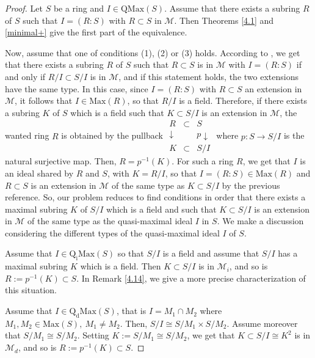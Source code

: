 \documentclass[12pt,leqno]{amsart}
\theoremstyle{definition}
\begin{document}
\begin{proof} Let $S$ be a ring and $I\in\mathrm{QMax}(S)$. Assume that there exists a subring $R$ of $S$ such that $I=(R:S)$ with $R\subset S$ in $\mathcal M$. Then Theorems \ref{4.1} and \ref{minimal+} give the first part of the equivalence. 

Now, assume that one of conditions (1), (2) or (3) holds. According to \cite[Proposition 4.7]{DPPS}, we get that there exists a subring $R$ of $S$ such that $R\subset S$ is in $\mathcal M$ with $I=(R:S)$ if and only if $R/I\subset S/I$ is in $\mathcal M$, and if this statement holds, the two extensions have the same type. In this case, since $I=(R:S)$ with $R\subset S$ an extension in $\mathcal M$, it follows that $I\in\mathrm{Max}(R)$, so that $R/I$ is a field. Therefore, if there exists a subring $K$ of $S$ which is a field such that $K\subset S/I$ is an extension in $\mathcal M$, the wanted ring $R$ is obtained by the  pullback  
$\begin{matrix}
        R         & \subset &         S            \\
\downarrow &      {}     & p\downarrow   \\
       K          & \subset &       S/I         
\end{matrix}$  
where $p:S\to S/I$ is the natural  surjective map. Then, $R=p^{-1}(K)$. For such a ring $R$, we get that $I$ is an ideal shared by $R$ and $S$, with $ K=R/I$, so that $I=(R:S)\in\mathrm{Max}(R)$ and $R\subset S$ is an  
extension in $\mathcal M$ of the same type as $K\subset S/I$ by the previous reference. So, our problem reduces to find conditions in order that there exists a maximal subring $K$ of $S/I$ which is a field and such that $K\subset S/I$ is an extension in $\mathcal M$ of the same type as the quasi-maximal ideal $I$ in $S$. We make a discussion considering the different types of the quasi-maximal ideal $I$ of $S$.

Assume that $I\in\mathrm{Q_iMax}(S)$ so that $S/I$ is a field and assume that $S/I$ has a maximal subring $K$ which is a field. Then $K\subset S/I$ is in $\mathcal M_i$, and so is $R:=p^{-1}(K)\subset S$. In Remark \ref{4.14}, we give a more precise characterization of this situation.

Assume that $I\in\mathrm{Q_dMax}(S)$, that is $I=M_1\cap M_2$ where $ M_1,M_2\in\mathrm{Max}(S),\ M_1\neq M_2$. Then, $S/I\cong S/M_1 \times S/M_2$. Assume moreover that $S/M_1\cong S/M_2$. Setting $K:= S/M_1\cong S/M_2$, we get that $K\subset S/I\cong K^2$ is in $\mathcal M_d$, and so is $R:=p^{-1}(K)\subset S$. 


\end{proof}
\end{document}

